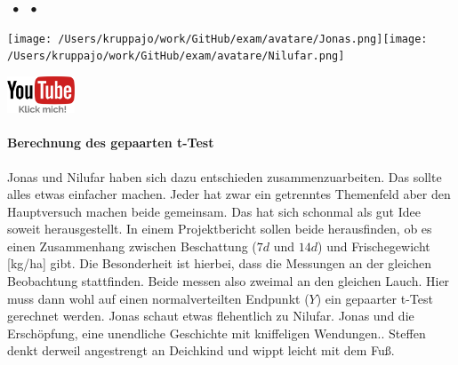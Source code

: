\documentclass[a4paper, 9pt]{scrartcl}\usepackage[]{graphicx}\usepackage[]{xcolor}
\begin{document}
 
\ifcollection
\begin{flushright}
\tiny\vspace{-3Ex}
\textbf{\examinhaltstart}
\exammodulestat $\;\bullet$
\exammodulestatversuch $\;\bullet$
\exammodulebiostat
\vspace{-4Ex}
\end{flushright}
\begin{minipage}[t]{0.5\textwidth}
\texttt{[image: /Users/kruppajo/work/GitHub/exam/avatare/Jonas.png]}\hspace{-4mm}\texttt{[image: /Users/kruppajo/work/GitHub/exam/avatare/Nilufar.png]}
\end{minipage}
\begin{minipage}[t]{0.5\textwidth}
\hfill
\href{https://youtu.be/QR90zyn0Iz8}{\includegraphics[width = 2cm]{img/youtube}}
\end{minipage}
\fi



\ifcollection
\paragraph{Berechnung des gepaarten t-Test}
\fi

Jonas und Nilufar haben sich dazu entschieden zusammenzuarbeiten. Das sollte alles etwas einfacher machen. Jeder hat zwar ein getrenntes Themenfeld aber den Hauptversuch machen beide gemeinsam. Das hat sich schonmal als gut Idee soweit herausgestellt. In einem Projektbericht sollen beide herausfinden, ob es einen Zusammenhang zwischen Beschattung ($7d$ und $14d$) und Frischegewicht [kg/ha] gibt. Die Besonderheit ist hierbei, dass die Messungen an der gleichen Beobachtung stattfinden. Beide messen also zweimal an den gleichen Lauch. Hier muss dann wohl auf einen normalverteilten Endpunkt ($Y$) ein gepaarter t-Test gerechnet werden. Jonas schaut etwas flehentlich zu Nilufar. Jonas und die Erschöpfung, eine unendliche Geschichte mit kniffeligen Wendungen.. Steffen denkt derweil angestrengt an Deichkind und wippt leicht mit dem Fuß.
\end{document}
